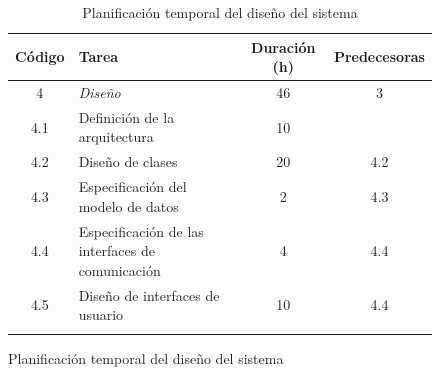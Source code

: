 \begin{figure}[H]
\begin{longtable}{ c p{} c c }
    \hline
    Código & Tarea & Duración (h) & Predecesoras \\
    \hline
    4 & \emph{Diseño} & 46 & 3 \\
    4.1 & Definición de la arquitectura & 10 &  \\
    4.2 & Diseño de clases & 20 & 4.2 \\
    4.3 & Especificación del modelo de datos & 2 & 4.3 \\
    4.4 & Especificación de las interfaces de comunicación & 4 & 4.4 \\
    4.5 & Diseño de interfaces de usuario & 10 & 4.4 \\
    \hline
    \caption{Planificación temporal del diseño del sistema}
    \label{pt:diseño}
\end{longtable}
\end{figure}

